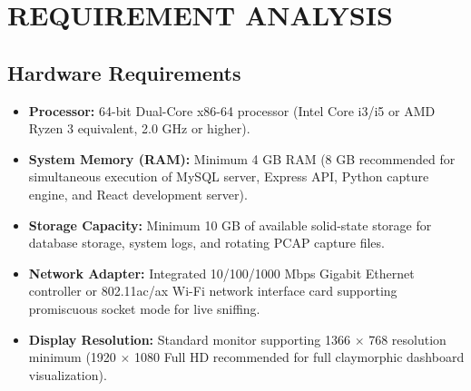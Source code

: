 \documentclass[a4paper,12pt]{report}
\begin{document}
	\chapter{REQUIREMENT ANALYSIS}
	
	\section{Hardware Requirements}
	\begin{itemize}
		\item \textbf{Processor:} 64-bit Dual-Core x86-64 processor (Intel Core i3/i5 or AMD Ryzen 3 equivalent, 2.0 GHz or higher).
		\item \textbf{System Memory (RAM):} Minimum 4 GB RAM (8 GB recommended for simultaneous execution of MySQL server, Express API, Python capture engine, and React development server).
		\item \textbf{Storage Capacity:} Minimum 10 GB of available solid-state storage for database storage, system logs, and rotating PCAP capture files.
		\item \textbf{Network Adapter:} Integrated 10/100/1000 Mbps Gigabit Ethernet controller or 802.11ac/ax Wi-Fi network interface card supporting promiscuous socket mode for live sniffing.
		\item \textbf{Display Resolution:} Standard monitor supporting 1366 $\times$ 768 resolution minimum (1920 $\times$ 1080 Full HD recommended for full claymorphic dashboard visualization).
	\end{itemize}
	
\end{document}
